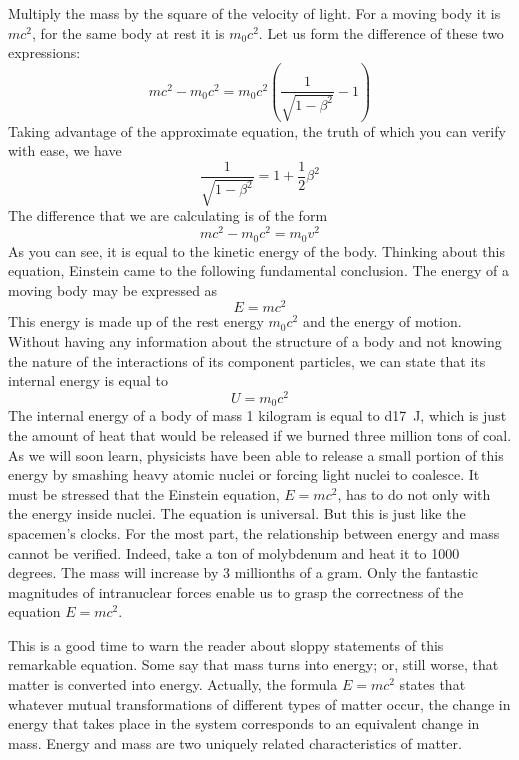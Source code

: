 Multiply the mass by the square of the velocity of light. For a moving body it is $mc^{2}$, for the same body at rest it is $m_{0}c^{2}$. Let us form the difference of these two expressions:
\begin{equation*}%
mc^{2} - m_{0}c^{2} = m_{0}c^{2} \left( \frac{1}{\sqrt{1 - \beta^{2}}} -1 \right)
\end{equation*}
Taking advantage of the approximate equation, the truth of which you can verify with ease, we have
\begin{equation*}%
\frac{1}{\sqrt{1 - \beta^{2}}} = 1 + \frac{1}{2} \beta^{2}
\end{equation*}
The difference that we are calculating is of the form
\begin{equation*}%
mc^{2} - m_{0}c^{2} = m_{0}v^{2}
\end{equation*}
As you can see, it is equal to the kinetic energy of the body.
Thinking about this equation, Einstein came to the following fundamental conclusion. The energy of a mov­ing body may be expressed as
\begin{equation*}%
E = mc^{2}
\end{equation*}
This energy is made up of the rest energy $m_{0}c^{2}$ and the energy of motion. Without having any information about the structure of a body and not knowing the nature of the interactions of its component particles, we can state that its internal energy is equal to
\begin{equation*}%
U=m_{0}c^{2}
\end{equation*}
The internal energy of a body of mass 1 kilogram is equal to \SI{d17}{\joule}, which is just the amount of heat that would be released if we burned three million tons of coal. As we will soon learn, physicists have been able to release a small portion of this energy by smashing heavy atomic nuclei or forcing light nuclei to coalesce.
It must be stressed that the Einstein equation, $E = mc^{2}$, has to do not only with the energy inside nuclei. The equation is universal. But this is just like the spacemen's clocks. For the most part, the relationship between energy and mass cannot be verified. Indeed, take a ton of molyb­denum and heat it to 1000 degrees. The mass will increase by 3 millionths of a gram. Only the fantastic magnitudes of intranuclear forces enable us to grasp the correctness of the equation $E = mc^{2}$.

This is a good time to warn the reader about sloppy statements of this remarkable equation. Some say that mass turns into energy; or, still worse, that matter is converted into energy. Actually, the formula $E = mc^{2}$ states that whatever mutual transformations of different types of matter occur, the change in energy that takes place in the system corresponds to an equivalent change in mass. Energy and mass are two uniquely related charac­teristics of matter.

